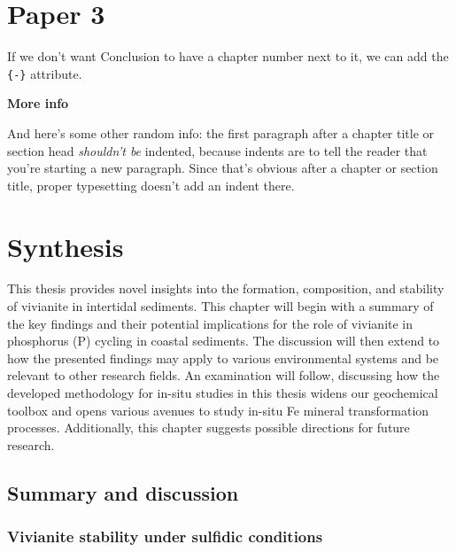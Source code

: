 \documentclass[12pt,twoside]{book}
\begin{document}
\chapter{Paper 3}\label{paper3}

If we don't want Conclusion to have a chapter number next to it, we can add the \texttt{\{-\}} attribute.

\textbf{More info}

And here's some other random info: the first paragraph after a chapter title or section head \emph{shouldn't be} indented, because indents are to tell the reader that you're starting a new paragraph. Since that's obvious after a chapter or section title, proper typesetting doesn't add an indent there.

\chapter{Synthesis}\label{synthesis}

This thesis provides novel insights into the formation, composition, and stability of vivianite in intertidal
sediments. This chapter will begin with a summary of the key findings and their potential implications for the
role of vivianite in phosphorus (P) cycling in coastal sediments. The discussion will then extend to how the
presented findings may apply to various environmental systems and be relevant to other research fields. An
examination will follow, discussing how the developed methodology for in-situ studies in this thesis widens
our geochemical toolbox and opens various avenues to study in-situ Fe mineral transformation processes.
Additionally, this chapter suggests possible directions for future research.

\section{Summary and discussion}\label{summary-and-discussion}

\subsection{Vivianite stability under sulfidic conditions}\label{vivianite-stability-under-sulfidic-conditions}
\end{document}
